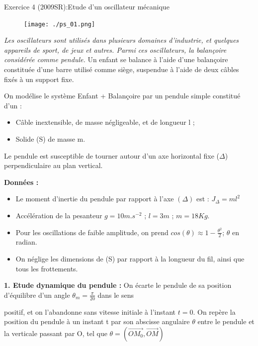 \documentclass[12pt, french]{article}
\begin{document}
\begin{Box2}{Exercice 4 (2009SR):Etude d’un oscillateur mécanique}

   
  \begin{figure}
  \begin{center}
	  \vspace{-0.6cm}
	\texttt{[image: ./ps\_01.png]}
  \end{center}
\end{figure}

  \emph{Les oscillateurs sont utilisés dans plusieurs domaines d’industrie, et quelques
appareils de sport, de jeux et autres. Parmi ces oscillateurs, la balançoire considérée
comme pendule.}
Un enfant se balance à l’aide d’une balançoire constituée d’une barre utilisé comme
siège, suspendue à l’aide de deux câbles fixés à un support fixe.

On modélise le système {Enfant + Balançoire} par un pendule simple constitué d’un :
\begin{itemize}
  \item Câble inextensible, de masse négligeable, et de longueur l ;
  \item Solide (S) de masse m.
\end{itemize}
Le pendule est susceptible de tourner autour d’un axe horizontal fixe ($\Delta$)
perpendiculaire au plan vertical.

\textbf{Données : }
\begin{itemize}
  \item Le moment d’inertie du pendule par rapport à l’axe $(\Delta)$ est : $J_{\Delta} = ml^2$
  \item Accélération de la pesanteur $g = 10 m.s^{-2}$ ; $l = 3m$ ; $m = 18Kg$.
  \item Pour les oscillations de faible amplitude, on prend $cos(\theta) \approx 1 - \frac{\theta^2}{2} $; $\theta$ en radian.
  \item On néglige les dimensions de (S) par rapport à la longueur du fil, ainsi que tous les
frottements.
\end{itemize}
  \textbf{1. Etude dynamique du pendule :}
  On écarte le pendule de sa position d’équilibre d’un angle $\theta_m = \frac{\pi}{20}$ dans le sens

positif, et on l’abandonne sans vitesse initiale à l’instant $t = 0$.
On repère la position du pendule à un instant t par son abscisse
angulaire $\theta$ entre le pendule et la verticale passant par O, tel que $\theta = (\vec{OM_0}, \vec{OM})$


\end{Box2}
\end{document}
